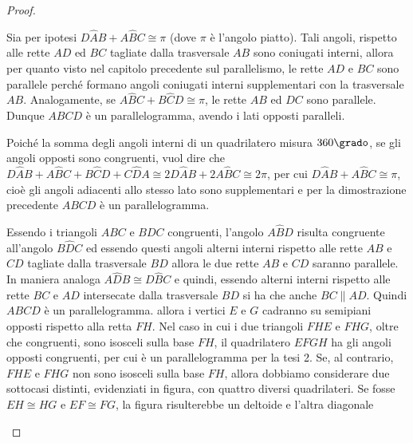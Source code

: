 \begin{proof}~\\
  \begin{enumerate*}
    \item Sia per ipotesi \(D\widehat{A}B+A\widehat{B}C\cong \pi\) (dove 
    \(\pi\) è l'angolo piatto). Tali angoli, rispetto alle rette \(AD\) ed 
    \(BC\) tagliate dalla trasversale \(AB\) sono coniugati interni, allora 
    per quanto visto nel capitolo precedente sul parallelismo, le rette 
    \(AD\) e \(BC\) sono parallele perché formano angoli coniugati interni 
    supplementari con la trasversale \(AB\). Analogamente, se 
    \(A\widehat{B}C+B\widehat{C}D\cong \pi\), le rette \(AB\) ed \(DC\) sono 
    parallele. Dunque \(ABCD\) è un parallelogramma, avendo i lati opposti 
    paralleli.
    \item Poiché la somma degli angoli interni di un quadrilatero misura 
    \(360\grado\), se gli angoli opposti sono congruenti, vuol dire che 
    \(D\widehat{A}B+A\widehat{B}C+B\widehat{C}D+C\widehat{D}A\cong 
    2D\widehat{A}B+2A\widehat{B}C\cong 2\pi\), per cui 
    \(D\widehat{A}B+A\widehat{B}C\cong\pi\), cioè gli angoli adiacenti allo 
    stesso lato sono supplementari e per la dimostrazione precedente 
    \(ABCD\) è un parallelogramma.
    \item Essendo i triangoli \(ABC\) e \(BDC\) congruenti, l'angolo 
    \(A\widehat{B}D\) risulta congruente all'angolo \(B\widehat{D}C\) ed 
    essendo questi angoli alterni interni rispetto alle rette \(AB\) e \(CD\) 
    tagliate dalla trasversale \(BD\) allora le due rette \(AB\) e \(CD\) 
    saranno parallele. In maniera analoga \(A\widehat{D}B\cong 
    D\widehat{B}C\) e quindi, essendo alterni interni rispetto alle rette 
    \(BC\) e \(AD\) intersecate dalla trasversale \(BD\) si ha che anche 
    \(BC\parallel AD\). Quindi \(ABCD\) è un parallelogramma.
    allora i vertici \(E\) e \(G\) cadranno su semipiani opposti rispetto 
    alla retta \(FH\). Nel caso in cui i due triangoli \(FHE\) e \(FHG\), oltre 
    che congruenti, sono isosceli sulla base \(FH\), il quadrilatero \(EFGH\) 
    ha gli angoli opposti congruenti, per cui è un parallelogramma per la 
    tesi 2. Se, al contrario, \(FHE\) e \(FHG\) non sono isosceli sulla base 
    \(FH\), allora dobbiamo considerare due sottocasi distinti, evidenziati 
    in figura, con quattro diversi quadrilateri. Se fosse \(EH\cong HG\) e 
    \(EF\cong FG\), la figura risulterebbe un deltoide e l'altra diagonale 

\end{enumerate*}
\end{proof}
